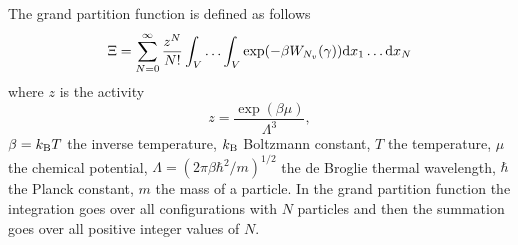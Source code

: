The grand partition function is defined as follows
\begin{equation}
	\Xi = \sum_{N=0}^{\infty}\frac{z^N}{N!} \int_{V} \dotsc \int_{V} \exp(-\beta W_{N_v}(\gamma)) {\rm d} x_1 \dotsc {\rm d} x_N
\end{equation}
where $z$ is the activity
\begin{equation*}
	z = \frac{\exp(\beta \mu)}{\Lambda^3},
\end{equation*}
$\beta = k_{\rm B} T$ the inverse temperature, $k_{\rm B}$ Boltzmann constant, $T$ the temperature, $\mu$ the chemical potential, $\Lambda = (2\pi\beta\hbar^2/m)^{1/2}$ the de Broglie thermal wavelength, $\hbar$ the Planck constant, $m$ the mass of a particle. In the grand partition function the integration goes over all configurations with $N$ particles and then the summation goes over all positive integer values of $N$.